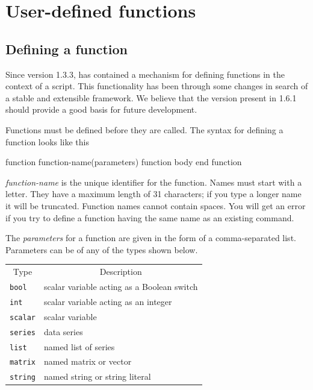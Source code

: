 \chapter{User-defined functions}
\label{chap:functions}

\section{Defining a function}
\label{func-define}

Since version 1.3.3,  has contained a mechanism for
defining functions in the context of a script.  This functionality has
been through some changes in search of a stable and extensible
framework.  We believe that the version present in  1.6.1
should provide a good basis for future development.

Functions must be defined before they are called.  The syntax for
defining a function looks like this
    
\begin{code}
function function-name(parameters)
   function body
end function
\end{code}

\textsl{function-name} is the unique identifier for the function.
Names must start with a letter. They have a maximum length of 31
characters; if you type a longer name it will be truncated.  Function
names cannot contain spaces.  You will get an error if you try to
define a function having the same name as an existing 
command.

The \textsl{parameters} for a function are given in the form of a
comma-separated list.  Parameters can be of any of the types shown
below.

\begin{center}
\begin{tabular}{ll}
\multicolumn{1}{c}{Type} & 
\multicolumn{1}{c}{Description} \\ [4pt]
\texttt{bool}   & scalar variable acting as a Boolean switch \\
\texttt{int}    & scalar variable acting as an integer  \\
\texttt{scalar} & scalar variable \\
\texttt{series} & data series \\
\texttt{list}   & named list of series \\
\texttt{matrix} & named matrix or vector \\
\texttt{string} & named string or string literal 
\end{tabular}
\end{center}

